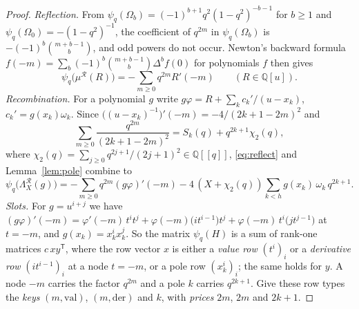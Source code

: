 \documentclass[11pt]{amsart}
\theoremstyle{definition}
\theoremstyle{remark}
\numberwithin{equation}{section}
\newcommand{\QQ}{\mathbb{Q}}
\newcommand{\cR}{\mathcal{R}}
\begin{document}
\begin{proof}
\emph{Reflection.} From $\psi_q(\Omega_b)=(-1)^{b+1}q^2(1-q^2)^{-b-1}$ for $b\ge1$ and $\psi_q(\Omega_0)=-(1-q^2)^{-1}$, the
coefficient of $q^{2m}$ in $\psi_q(\Omega_b)$ is $-(-1)^b\binom{m+b-1}{b}$, and odd powers do not occur. Newton's backward
formula $f(-m)=\sum_b(-1)^b\binom{m+b-1}b\Delta^bf(0)$ for polynomials $f$ then gives
\begin{equation}\label{eq:reflect}
  \psi_q\bigl(\mu^{\cR}(R)\bigr)=-\sum_{m\ge0}q^{2m}R'(-m)\qquad(R\in\QQ[u]).
\end{equation}
\emph{Recombination.} For a polynomial $g$ write $g\varphi=R+\sum_kc_k'/(u-x_k)$, $c_k'=g(x_k)\omega_k$. Since
$\bigl((u-x_k)^{-1}\bigr)'(-m)=-4/(2k+1-2m)^2$ and
\[
  \sum_{m\ge0}\frac{q^{2m}}{(2k+1-2m)^2}=S_k(q)+q^{2k+1}\chi_2(q),
\]
where $\chi_2(q)=\sum_{j\ge0}q^{2j+1}/(2j+1)^2\in\QQ[[q]]$, \eqref{eq:reflect} and Lemma~\ref{lem:pole} combine to
\begin{equation}\label{eq:recomb}
  \psi_q\bigl(\Lambda^{\cR}_X(g)\bigr)=-\sum_{m\ge0}q^{2m}(g\varphi)'(-m)-4\,(X+\chi_2(q))\sum_{k<h}g(x_k)\,\omega_k\,q^{2k+1}.
\end{equation}
\emph{Slots.} For $g=u^{i+j}$ we have
$(g\varphi)'(-m)=\varphi'(-m)\,t^it^j+\varphi(-m)\bigl(it^{i-1}\bigr)t^j+\varphi(-m)\,t^i\bigl(jt^{j-1}\bigr)$ at $t=-m$, and
$g(x_k)=x_k^ix_k^j$. So the matrix $\psi_q(H)$ is a sum of rank-one matrices $c\,xy^{\mathsf T}$, where the row vector $x$ is
either a \emph{value row} $(t^i)_i$ or a \emph{derivative row} $(it^{i-1})_i$ at a node $t=-m$, or a pole row
$(x_k^i)_i$; the same holds for $y$. A node $-m$ carries the factor $q^{2m}$ and a pole $k$ carries $q^{2k+1}$. Give these
row types the \emph{keys} $(m,\mathrm{val})$, $(m,\mathrm{der})$ and $k$, with \emph{prices} $2m$, $2m$ and $2k+1$.


\end{proof}
\end{document}
